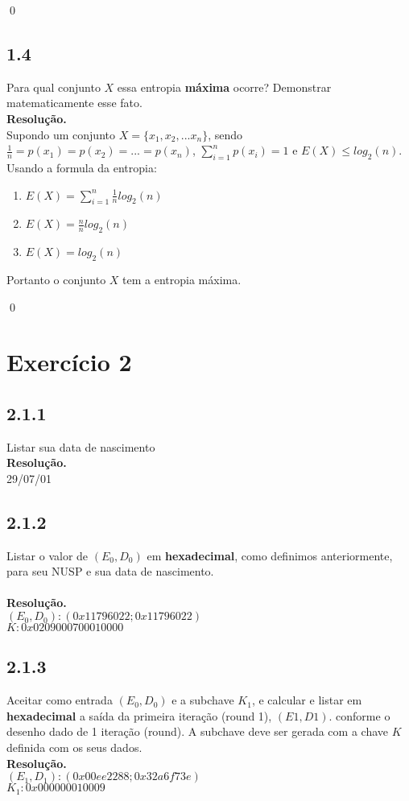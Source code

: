 \documentclass[12pt,letterpaper]{article}
\newcommand\answer{\textbf{Resolução.}\xspace}
\begin{document}
\qed

\subsection*{1.4}
Para qual conjunto $X$ essa entropia \textbf{máxima} ocorre? Demonstrar matematicamente esse fato. \\

\answer \\
Supondo um conjunto $X = \{x_1, x_2,... x_n\}$, sendo $\frac{1}{n} = p(x_1) = p(x_2) = ... = p(x_n)$, $\sum_{i=1}^np(x_i) = 1$ e $E(X) \leq log_2(n)$. Usando a formula da entropia:

\begin{enumerate}
    \item $E(X) = \sum_{i=1}^n \frac{1}{n} log_2(n)$
    \item $E(X) = \frac{n}{n} log_2(n)$
    \item $E(X) = log_2(n)$
\end{enumerate}

Portanto o conjunto $X$ tem a entropia máxima.

\qed


\section*{Exercício 2}

\subsection*{2.1.1}
Listar sua data de nascimento \\ 
\answer \\
29/07/01

\subsection*{2.1.2}
Listar o valor de $(E_0, D_0)$ em \textbf{hexadecimal}, como definimos anteriormente, para seu NUSP e sua data de nascimento.\\ \\
\answer \\
$(E_0, D_0): (0x11796022; 0x11796022)$ \\
$K  : 0x0209000700010000$

\subsection*{2.1.3}
Aceitar como entrada $(E_0,D_0)$ e a subchave $K_1$, e calcular e listar em \textbf{hexadecimal} a saída da primeira iteração (round 1), $(E1,D1)$. conforme o desenho dado de 1 iteração (round). A subchave deve ser gerada com a chave $K$ definida com os seus dados. \\ 
\answer \\
$(E_1, D_1): (0x00ee2288; 0x32a6f73e)$ \\
$K_1  : 0x000000010009$
\end{document}
